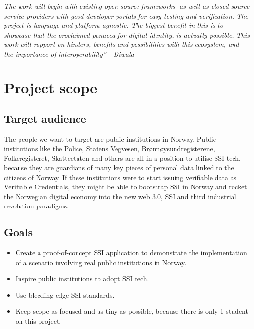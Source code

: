 \emph{The work will begin with existing open source frameworks, as well
as closed source service providers with good developer portals for easy
testing and verification. The project is language and platform agnostic.
The biggest benefit in this is to showcase that the proclaimed panacea
for digital identity, is actually possible. This work will rapport on
hinders, benefits and possibilities with this ecosystem, and the
importance of interoperability'' - Diwala}

\hypertarget{project-scope}{%
\section{Project scope}\label{project-scope}}

\hypertarget{target-audience}{%
\subsection{Target audience}\label{target-audience}}

The people we want to target are public institutions in Norway. Public
institutions like the Police, Statens Vegvesen, Brønnøysundregisterene,
Folkeregisteret, Skatteetaten and others are all in a position to
utilise SSI tech, because they are guardians of many key pieces of
personal data linked to the citizens of Norway. If these institutions
were to start issuing verifiable data as Verifiable Credentials, they
might be able to bootstrap SSI in Norway and rocket the Norwegian
digital economy into the new web 3.0, SSI and third industrial
revolution paradigms.

\hypertarget{goals}{%
\subsection{Goals}\label{goals}}

\begin{itemize}
\tightlist
\item
  Create a proof-of-concept SSI application to demonstrate the
  implementation of a scenario involving real public institutions in
  Norway.
\item
  Inspire public institutions to adopt SSI tech.
\item
  Use bleeding-edge SSI standards.
\item
  Keep scope as focused and as tiny as possible, because there is only 1
  student on this project.
\end{itemize}

